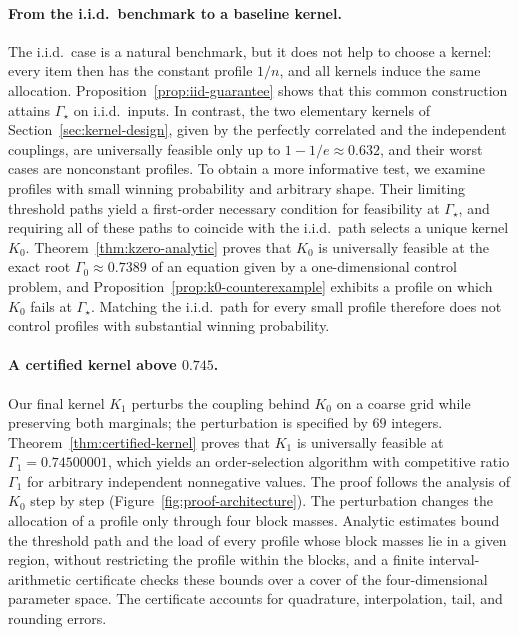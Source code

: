 \documentclass[11pt]{article}
\theoremstyle{definition}
\theoremstyle{remark}
\begin{document}
\paragraph{From the i.i.d.\ benchmark to a baseline kernel.}
The i.i.d.\ case is a natural benchmark, but it does not help to choose a kernel: every item
then has the constant profile $1/n$, and all kernels induce the same allocation.
Proposition~\ref{prop:iid-guarantee} shows that this common construction attains
$\Gamma_\star$ on i.i.d.\ inputs. In contrast, the two elementary kernels of
Section~\ref{sec:kernel-design}, given by the perfectly correlated and the independent couplings, are
universally feasible only up to $1-1/e\approx0.632$, and their worst cases are nonconstant
profiles. To obtain a more informative test, we examine profiles with small winning
probability and arbitrary shape. Their limiting threshold paths yield a first-order necessary
condition for feasibility at $\Gamma_\star$, and requiring all of these paths to coincide with
the i.i.d.\ path selects a unique kernel $K_0$. Theorem~\ref{thm:kzero-analytic} proves that
$K_0$ is universally feasible at the exact root $\Gamma_0\approx0.7389$ of an equation given by
a one-dimensional control problem, and Proposition~\ref{prop:k0-counterexample} exhibits a
profile on which $K_0$ fails at $\Gamma_\star$. Matching the i.i.d.\ path for every small
profile therefore does not control profiles with substantial winning probability.

\paragraph{A certified kernel above $0.745$.}
Our final kernel $K_1$ perturbs the coupling behind $K_0$ on a coarse grid while preserving
both marginals; the perturbation is specified by $69$ integers.
Theorem~\ref{thm:certified-kernel} proves that $K_1$ is universally feasible at
$\Gamma_1=0.74500001$, which yields an order-selection algorithm with competitive ratio
$\Gamma_1$ for arbitrary independent nonnegative values. The proof follows the analysis of
$K_0$ step by step (Figure~\ref{fig:proof-architecture}). The perturbation changes the
allocation of a profile only through four block masses. Analytic estimates bound the threshold path and the
load of every profile whose block masses lie in a given region, without restricting the
profile within the blocks, and a finite interval-arithmetic certificate checks these bounds
over a cover of the four-dimensional parameter space. The certificate accounts for
quadrature, interpolation, tail, and rounding errors.
\end{document}
